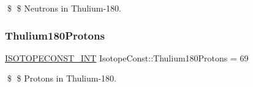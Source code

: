 \$ \$ Neutrons in Thulium-\/180. \mbox{\label{group___isotope_const-_thulium-_tm180_ga02a62622dc748bb4cfaa30ab02155e18}} 
\subsubsection{\texorpdfstring{Thulium180\+Protons}{Thulium180Protons}}
{\footnotesize\ttfamily \mbox{\hyperlink{group___isotope_const-_macros_ga5f18360b3e99483a35c32d789e62621c}{I\+S\+O\+T\+O\+P\+E\+C\+O\+N\+S\+T\+\_\+\+I\+NT}} Isotope\+Const\+::\+Thulium180\+Protons = 69}

\$ \$ Protons in Thulium-\/180. 